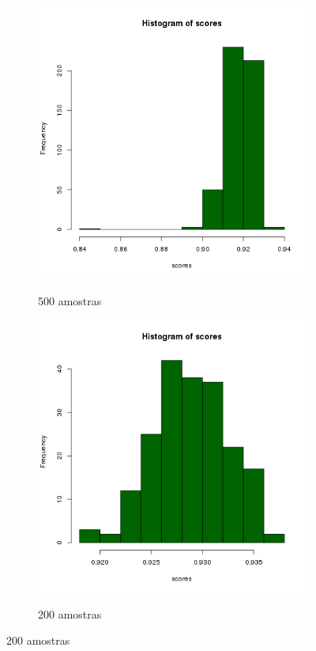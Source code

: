 \documentclass[11pt,a4paper]{article}
\begin{document}
\begin{figure}[H]
    \caption{Histogramas - iPad 3 Safari}
    \label{safarihistogramas}
    \begin{subfigure}{.5\textwidth}
        \caption{500 amostras}
        \centering
        \includegraphics[width=\textwidth]{images/hist-freq-ipad-3-ios7-safari-500-amostras-20131119}
        \label{safarihistograma500}
    \end{subfigure}
    \begin{subfigure}{.5\textwidth}
        \caption{200 amostras}
        \centering
        \includegraphics[width=\textwidth]{images/hist-freq-ipad-3-ios7-safari-200-amostras-20131126}
        \label{safarihistograma200}
    \end{subfigure}
\end{figure}
\end{document}
